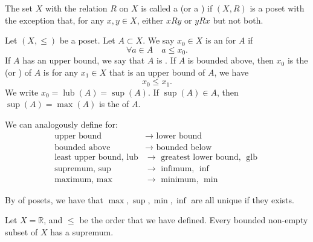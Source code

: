 \documentclass[notoc,notitlepage]{tufte-book}
\DeclareMathOperator{\lub}{lub }
\DeclareMathOperator{\glb}{glb }
\begin{document}
\begin{defn}\label{defn:totally_ordered_sets_chains}
  The set $X$ with the relation $R$ on $X$ is called a  (or a ) if $(X, R)$ is a poset with the exception that, for any $x, y \in X$, either $xRy$ or $yRx$ but not both.
\end{defn}

\begin{defn}[Bounds]\label{defn:bounds}
  Let $(X, \leq)$ be a poset. Let $A \subset X$. We say $x_0 \in X$ is an  for $A$ if
  \begin{equation*}
    \forall a \in A \quad a \leq x_0.
  \end{equation*}
  If $A$ has an upper bound, we say that $A$ is . If $A$ is bounded above, then $x_0$ is the  (or ) of $A$ is for any $x_1 \in X$ that is an upper bound of $A$, we have
  \begin{equation*}
    x_0 \leq x_1.
  \end{equation*}
  We write $x_0 = \lub (A) = \sup (A)$. If $\sup (A) \in A$, then $\sup (A) = \max (A)$ is the  of $A$.

  We can analogously define for:
  \begin{align*}
    \text{upper bound } &\to \text{ lower bound } \\
    \text{bounded above } &\to \text{ bounded below } \\
    \text{least upper bound, } \lub &\to \text{ greatest lower bound, } \glb \\
    \text{supremum, } \sup &\to \text{ infimum, } \inf \\
    \text{maximum, } \max &\to \text{ minimum, } \min
  \end{align*}
\end{defn}

\begin{note}
  By  of posets, we have that $\max, \sup, \min, \inf$ are all unique if they exists.
\end{note}

\begin{eg}
  Let $X = \mathbb{R}$, and $\leq$ be the order that we have defined. Every bounded non-empty subset of $X$ has a supremum.
\end{eg}
\end{document}
